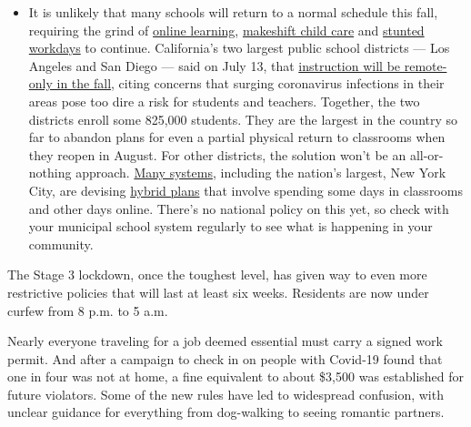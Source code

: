 \begin{itemize}
  \begin{itemize}
  \tightlist
  \item
    It is unlikely that many schools will return to a normal schedule
    this fall, requiring the grind of
    \href{https://www.nytimes.com/2020/06/05/us/coronavirus-education-lost-learning.html?action=click\&pgtype=Article\&state=default\&region=MAIN_CONTENT_3\&context=storylines_faq}{online
    learning},
    \href{https://www.nytimes.com/2020/05/29/us/coronavirus-child-care-centers.html?action=click\&pgtype=Article\&state=default\&region=MAIN_CONTENT_3\&context=storylines_faq}{makeshift
    child care} and
    \href{https://www.nytimes.com/2020/06/03/business/economy/coronavirus-working-women.html?action=click\&pgtype=Article\&state=default\&region=MAIN_CONTENT_3\&context=storylines_faq}{stunted
    workdays} to continue. California's two largest public school
    districts --- Los Angeles and San Diego --- said on July 13, that
    \href{https://www.nytimes.com/2020/07/13/us/lausd-san-diego-school-reopening.html?action=click\&pgtype=Article\&state=default\&region=MAIN_CONTENT_3\&context=storylines_faq}{instruction
    will be remote-only in the fall}, citing concerns that surging
    coronavirus infections in their areas pose too dire a risk for
    students and teachers. Together, the two districts enroll some
    825,000 students. They are the largest in the country so far to
    abandon plans for even a partial physical return to classrooms when
    they reopen in August. For other districts, the solution won't be an
    all-or-nothing approach.
    \href{https://bioethics.jhu.edu/research-and-outreach/projects/eschool-initiative/school-policy-tracker/}{Many
    systems}, including the nation's largest, New York City, are
    devising
    \href{https://www.nytimes.com/2020/06/26/us/coronavirus-schools-reopen-fall.html?action=click\&pgtype=Article\&state=default\&region=MAIN_CONTENT_3\&context=storylines_faq}{hybrid
    plans} that involve spending some days in classrooms and other days
    online. There's no national policy on this yet, so check with your
    municipal school system regularly to see what is happening in your
    community.
  \end{itemize}
\end{itemize}

The Stage 3 lockdown, once the toughest level, has given way to even
more restrictive policies that will last at least six weeks. Residents
are now under curfew from 8 p.m. to 5 a.m.

Nearly everyone traveling for a job deemed essential must carry a signed
work permit. And after a campaign to check in on people with Covid-19
found that one in four was not at home, a fine equivalent to about
\$3,500 was established for future violators. Some of the new rules have
led to widespread confusion, with unclear guidance for everything from
dog-walking to seeing romantic partners.

